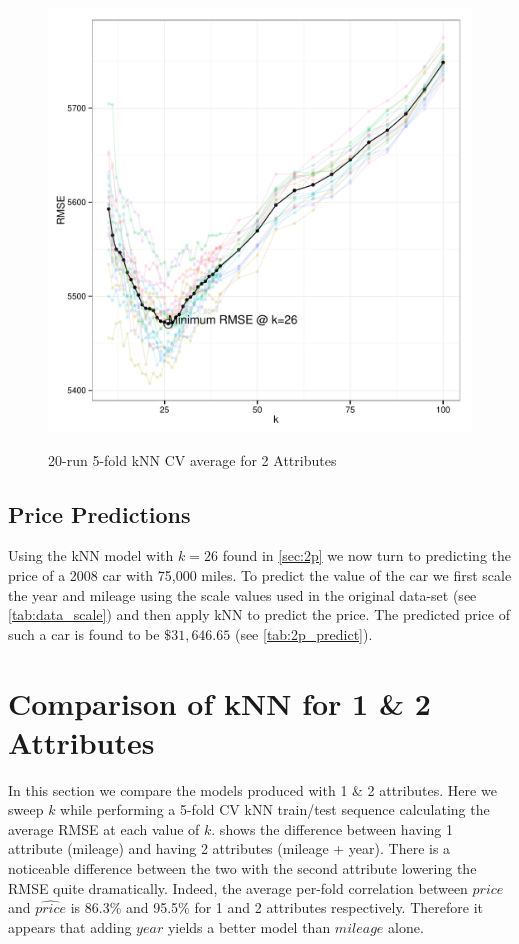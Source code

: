 \documentclass[11pt, fleqn]{article}
\begin{document}
\begin{figure}[!htb]
  \centering
  \caption{20-run 5-fold kNN CV average for 2 Attributes}
  \includegraphics[scale=.5]{2p_cv_multi_k.pdf}
  \label{fig:2p_k_multi}
\end{figure}

\subsection{Price Predictions}
Using the kNN model with $k=26$ found in \cref{sec:2p} we now turn to predicting the price of a 2008 car with 75,000 miles.  To predict the value of the car we first scale the year and mileage using the scale values used in the original data-set (see \cref{tab:data_scale}) and then apply kNN to predict the price.  The predicted price of such a car is found to be $\$31,646.65$ (see \cref{tab:2p_predict}).



\section{Comparison of kNN for 1 \& 2 Attributes}
In this section we compare the models produced with 1 \& 2 attributes.  Here we sweep $k$ while performing a 5-fold CV kNN train/test sequence calculating the average RMSE at each value of $k$.   shows the difference between having 1 attribute (mileage) and having 2 attributes (mileage + year).  There is a noticeable difference between the two with the second attribute lowering the RMSE quite dramatically.  Indeed, the average per-fold correlation between $price$ and $\widehat{price}$ is 86.3\% and 95.5\% for 1 and 2 attributes respectively.  Therefore it appears that adding $year$ yields a better model than $mileage$ alone.
\end{document}
